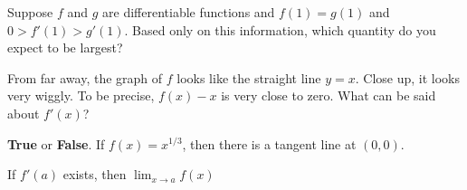 \documentclass{ximera}
\newcommand{\recommendation}[1]{}
\newcommand{\GoodQuestions}[1]{}
\begin{document}
\begin{problem}
  Suppose $f$ and $g$ are differentiable functions and $f(1) = g(1)$ and 
  $0 > f'(1) > g'(1)$.  Based only on this information, which quantity
  do you expect to be largest?
  \begin{multipleChoice}
  \end{multipleChoice}
\end{problem}



\begin{problem}
  From far away, the graph of $f$ looks like the straight line
  $y = x$.  Close up, it looks very wiggly.  To be precise, $f(x) - x$
  is very close to zero.  What can be said about $f'(x)$?
  \begin{multipleChoice}
  \end{multipleChoice}
\end{problem}

\begin{problem}
  \recommendation{Vic}
  \GoodQuestions{Subject: Derivatives 2Q}


  \textbf{True} or \textbf{False}.  If $f(x)=x^{1/3}$, then there is a
  tangent line at $(0,0)$.
  \begin{multipleChoice}
  \end{multipleChoice}
\end{problem}

\begin{problem}
  \recommendation{Vic}

  \GoodQuestions{Subject: Derivatives 7P}
  If $f'(a)$ exists, then $\lim_{x\to a}f(x)$
  \begin{multipleChoice}
  \end{multipleChoice}
\end{problem}
\end{document}
